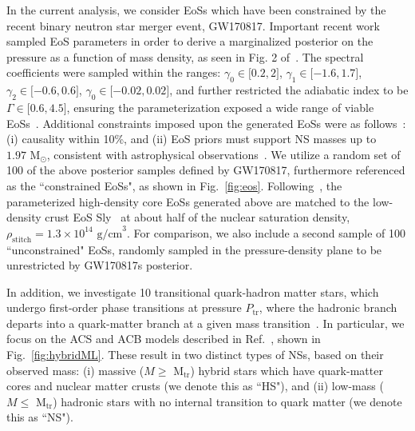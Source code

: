 \documentclass[prd,twocolumn,nofootinbib,superscriptaddress,amsmath,amssymb]{revtex4-1}
\begin{document}
In the current analysis, we consider EoSs which have been constrained by the recent binary neutron star merger event, GW170817.
Important recent work~\cite{LIGO:posterior,Carney:2018sdv} sampled EoS parameters in order to derive a marginalized posterior on the pressure as a function of mass density, as seen in Fig. 2 of~\cite{LIGO:posterior}.
The spectral coefficients were sampled within the ranges: $\gamma_0 \in \lbrack 0.2,2 \rbrack$, $\gamma_1 \in \lbrack -1.6,1.7 \rbrack$, $\gamma_2 \in \lbrack -0.6,0.6 \rbrack$, $\gamma_0 \in \lbrack -0.02,0.02 \rbrack$, and further restricted the adiabatic index to be $\Gamma \in \lbrack 0.6,4.5 \rbrack$, ensuring the parameterization exposed a wide range of viable EoSs~\cite{Lindblom:parameters}.
Additional constraints imposed upon the generated EoSs were as follows~\cite{LIGO:posterior}: (i) causality within 10\%, and (ii) EoS priors must support NS masses up to $1.97 \text{ M}_{\odot}$, consistent with astrophysical observations~\cite{Zhao:massiveNS}.
We utilize a random set of 100 of the above posterior samples defined by GW170817, furthermore referenced as the ``constrained EoSs", as shown in Fig.~\ref{fig:eos}.
Following~\cite{Read2009}, the parameterized high-density core EoSs generated above are matched to the low-density crust EoS Sly~\cite{Douchin:2001sv} at about half of the nuclear saturation density, $\rho_{\text{stitch}}=1.3 \times 10^{14} \text{ g/cm}^3$.
For comparison, we also include a second sample of 100 ``unconstrained" EoSs, randomly sampled in the pressure-density plane to be unrestricted by GW170817s posterior.

In addition, we investigate 10 transitional quark-hadron matter stars, which undergo first-order phase transitions at pressure $P_{\text{tr}}$, where the hadronic branch departs into a quark-matter branch at a given mass transition~\cite{Paschalidis2018,Alford:2017qgh,1971SvA....15..347S,Zdunik:2012dj,Alford:2013aca}.
In particular, we focus on the ACS and ACB models described in Ref.~\cite{Paschalidis2018}, shown in Fig.~\ref{fig:hybridML}.
These result in two distinct types of NSs, based on their observed mass: (i) massive ($M \geq \text{ M}_{\text{tr}}$) hybrid stars which have quark-matter cores and nuclear matter crusts (we denote this as ``HS"), and (ii) low-mass ($M \leq \text{ M}_{\text{tr}}$) hadronic stars with no internal transition to quark matter (we denote this as ``NS").
\end{document}
